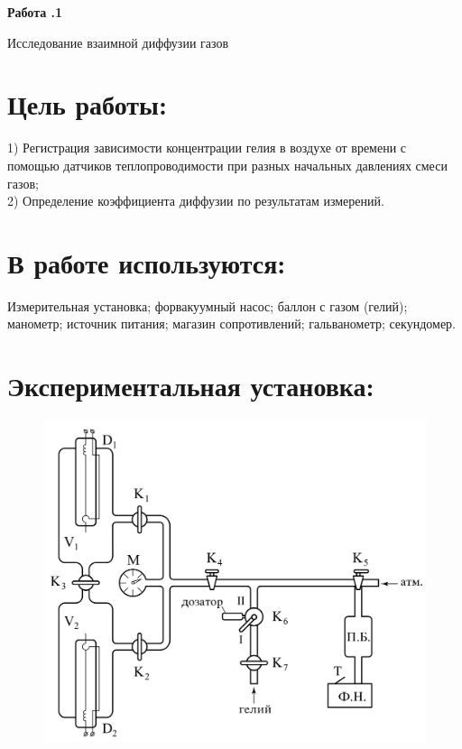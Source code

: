 \documentclass[a4paper, fontsize=12bp]{article}
\begin{document}




\huge
\centering
\textbf{Работа .1}


\Large
Исследование взаимной диффузии газов
\vspace{0.5cm}

\raggedright
\normalsize
\section*{Цель работы:}
1) Регистрация зависимости концентрации гелия в воздухе от времени с помощью датчиков теплопроводимости при разных начальных давлениях смеси газов;\\
2) Определение коэффициента диффузии по результатам измерений.

\section*{В работе используются:}
Измерительная установка; форвакуумный насос; баллон с газом (гелий); манометр; источник питания; магазин сопротивлений; гальванометр; секундомер.

\section*{{\large \textbf{Экспериментальная установка:}}}
\begin{figure}[H]
\center
\includegraphics[scale=0.3]{asd.png}
\end{figure}
\end{document}
